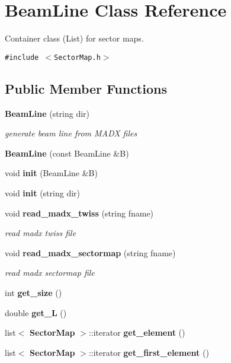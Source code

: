 \section{Beam\-Line Class Reference}
\label{classBeamLine}
Container class (List) for sector maps. 


{\tt \#include $<$Sector\-Map.h$>$}

\subsection*{Public Member Functions}
\begin{CompactItemize}
\item 
{\bf Beam\-Line} (string dir)
\begin{CompactList}\small\item\em generate beam line from MADX files\item\end{CompactList}\item 
{\bf Beam\-Line} (const Beam\-Line \&B)\label{classBeamLine_a2}

\item 
void {\bf init} (Beam\-Line \&B)\label{classBeamLine_a4}

\item 
void {\bf init} (string dir)\label{classBeamLine_a5}

\item 
void {\bf read\_\-madx\_\-twiss} (string fname)
\begin{CompactList}\small\item\em read madx twiss file\item\end{CompactList}\item 
void {\bf read\_\-madx\_\-sectormap} (string fname)
\begin{CompactList}\small\item\em read madx sectormap file\item\end{CompactList}\item 
int {\bf get\_\-size} ()\label{classBeamLine_a8}

\item 
double {\bf get\_\-L} ()\label{classBeamLine_a9}

\item 
list$<$ {\bf Sector\-Map} $>$::iterator {\bf get\_\-element} ()\label{classBeamLine_a10}

\item 
list$<$ {\bf Sector\-Map} $>$::iterator {\bf get\_\-first\_\-element} ()\label{classBeamLine_a11}


\end{CompactItemize}
